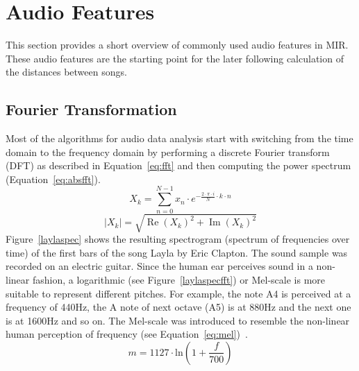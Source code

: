 \section{Audio Features}\label{featsec2}

This section provides a short overview of commonly used audio features in MIR. These audio features are the starting point for the later following calculation of the distances between songs.

\subsection{Fourier Transformation}\label{featsec}

Most of the algorithms for audio data analysis start with switching from the time domain to the frequency domain by performing a discrete Fourier transform (DFT) as described in Equation~\eqref{eq:fft} and then computing the power spectrum (Equation~\eqref{eq:absfft}).
\begin{equation} \label{eq:fft}
X_k = \sum_{n=0}^{N-1}{x_n \cdot e^ { - \frac{ 2 \cdot \pi \cdot i}{N}\cdot k\cdot n}}
\end{equation}
\begin{equation} \label{eq:absfft}
|X_k| = \sqrt{\operatorname{Re}(X_k)^2 + \operatorname{Im}(X_k)^2}
\end{equation}
Figure~\ref{laylaspec} shows the resulting spectrogram (spectrum of frequencies over time) of the first bars of the song Layla by Eric Clapton. The sound sample was recorded on an electric guitar. Since the human ear perceives sound in a non-linear fashion, a logarithmic (see Figure~\ref{laylaspecfft}) or Mel-scale is more suitable to represent different pitches. For example, the note A4 is perceived at a frequency of 440Hz, the A note of next octave (A5) is at 880Hz and the next one is at 1600Hz and so on. The Mel-scale was introduced to resemble the non-linear human perception of frequency (see Equation~\eqref{eq:mel})~\cite[pp. 53f]{knees1}.
\begin{equation} \label{eq:mel}
m = 1127 \cdot \text{ln}(1 + \frac{f}{700})
\end{equation}
